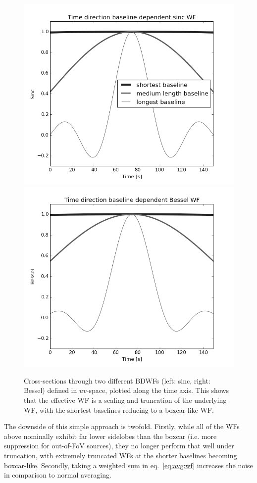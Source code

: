 \documentclass[useAMS,usenatbib]{mn2e}
\newcommand{\OMS}[1]{\textcolor{red}{{\bf OMS: #1}}}
\begin{document}
\begin{figure}%
\includegraphics[width=.4\textwidth]{./Figures/sinc-baseline_longMidShortshortgrey.png}%
\includegraphics[width=.4\textwidth]{./Figures/bessel-baseline_longMidShortshortgrey.png}
\caption{Cross-sections through two different BDWFs (left: sinc, right: Bessel) defined in $uv$-space, 
plotted along the time axis. This shows that the effective WF is a scaling and truncation of the underlying WF, with
the shortest baselines reducing to a boxcar-like WF.
}
\label{fig:WF:perbaseline}
\end{figure}

The downside of this simple approach is twofold. Firstly, while all of the WFs above nominally exhibit far lower 
sidelobes than the boxcar
(i.e. more suppression for out-of-FoV sources), they no longer perform that well under truncation, with extremely truncated WFs 
at the shorter baselines becoming boxcar-like. Secondly, taking a weighted sum in eq.~\ref{eq:avg:wf} increases 
the noise in comparison to normal averaging.


\end{document}
